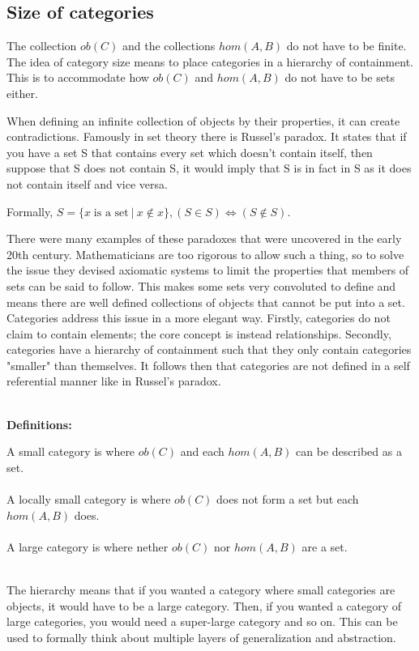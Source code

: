 \documentclass[10pt,a4paper]{amsart}
\begin{document}
\subsection{Size of categories}
\begin{flushleft}
The collection $ob(C)$ and the collections $hom(A,B)$ do not have to be finite.
The idea of category size means to place categories in a hierarchy of containment.
This is to accommodate how $ob(C)$ and $hom(A,B)$ do not have to be sets either.

When defining an infinite collection of objects by their properties, it can create contradictions.
Famously in set theory there is Russel's paradox.
It states that if you have a set S that contains every set which doesn't contain itself,
then suppose that S does not contain S, 
it would imply that S is in fact in S as it does not contain itself and vice versa.

Formally, $S = \{x\;\text{is a set}\:|\:x\notin x\}, (S\in S) \iff (S\notin S)$.

There were many examples of these paradoxes
that were uncovered in the early 20th century.
Mathematicians are too rigorous to allow such a thing,
so to solve the issue they devised axiomatic systems to limit the properties that members of sets can be said to follow.
This makes some sets very convoluted to define and means there are well defined collections of objects that cannot be put into a set.
Categories address this issue in a more elegant way.
Firstly, categories do not claim to contain elements; the core concept is instead relationships.
Secondly, categories have a hierarchy of containment such that they only contain categories "smaller" than themselves.
It follows then that categories are not defined in a self referential manner like in Russel's paradox.\\\;\\

\begin{center}\textbf{Definitions:}

A small category is where $ob(C)$ and each $hom(A,B)$ can be described as a set.\\\;\\

A locally small category is where $ob(C)$ does not form a set but each $hom(A,B)$ does.\\\;\\

A large category is where nether $ob(C)$ nor $hom(A,B)$ are a set.\\\;\\\end{center}
The hierarchy means that if you wanted a category where small categories are objects,
it would have to be a large category.
Then, if you wanted a category of large categories, you would need a super-large category and so on.
This can be used to formally think about multiple layers of generalization and abstraction.
\end{flushleft}
\end{document}
